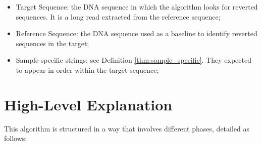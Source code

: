 \begin{itemize}
    \item Target Sequence: the DNA sequence in which the algorithm looks for reverted sequences. It is a long read extracted from the reference sequence;
    \item Reference Sequence: the DNA sequence used as a baseline to identify reverted sequences in the target;
    \item Sample-specific strings: see Definition \ref{thm:sample_specific}. They expected to appear in order within the target sequence;
\end{itemize}




\section{High-Level Explanation}

This algorithm is structured in a way that involves different phases, detailed as follows:

